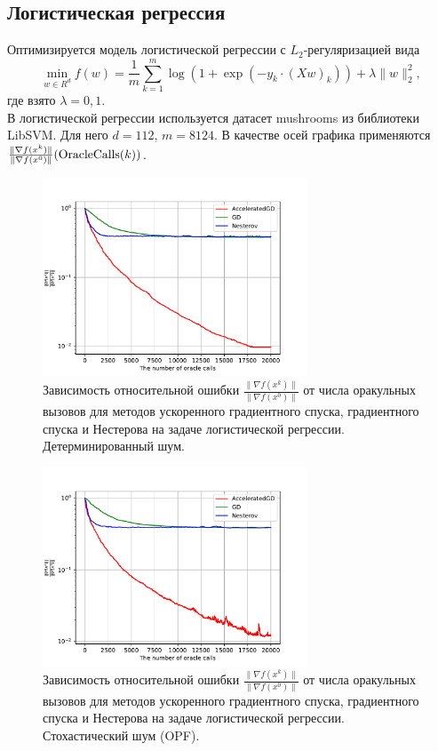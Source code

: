 \documentclass{article}
\begin{document}
\subsection{Логистическая регрессия}
Оптимизируется модель логистической регрессии с $L_2$-регуляризацией вида
\begin{equation}
 \min\limits_{w \in R^d} f(w) = \frac{1}{m}\sum\limits_{k = 1}^m \log(1 + \exp(-y_k \cdot (Xw)_k)) + \lambda \|w\|_2^2,
\end{equation}
где взято $\lambda = 0,1$.\\
В логистической регрессии используется датасет mushrooms из библиотеки LibSVM. Для него $d = 112$, $m = 8124$. В качестве осей графика применяются $\frac{\|\nabla f(x^k)\|}{\|\nabla f(x^0)\|} (\textnormal{OracleCalls}(k))$.
\begin{figure}[!htbp]
\centering
  \includegraphics[width=0.7\textwidth]{../figures/Non_stochastic_Logreg_AGD_GD_Nesterov_18_1e-06_0.0001.pdf}
 \caption{Зависимость относительной ошибки $\frac{\|\nabla f(x^k)\|}{\|\nabla f(x^0)\|}$ от числа оракульных вызовов для методов ускоренного градиентного спуска, градиентного спуска и Нестерова на задаче логистической регрессии. Детерминированный шум.}
  \label{fig:non-stochastic_logreg}
\end{figure}
\begin{figure}[!htbp]
\centering
  \includegraphics[width=0.7\textwidth]{../figures/Stochastic_Logreg_AGD_GD_Nesterov_18_1e-06_0.0001.pdf}
 \caption{Зависимость относительной ошибки $\frac{\|\nabla f(x^k)\|}{\|\nabla f(x^0)\|}$ от числа оракульных вызовов для методов ускоренного градиентного спуска, градиентного спуска и Нестерова на задаче логистической регрессии. Стохастический шум (OPF).}
  \label{fig:non-stochastic_logreg}
\end{figure}
\end{document}
